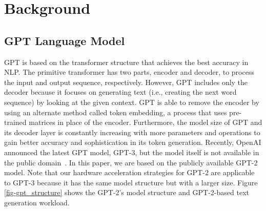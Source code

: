 

\section{Background}
\label{background}

\subsection{GPT Language Model} \label{background_gpt}


GPT is based on the transformer\cite{vaswani2017attention} structure that achieves the best accuracy in NLP. The primitive transformer has two parts, encoder and decoder, to process the input and output sequence, respectively. However, GPT includes only the decoder because it focuses on generating text (i.e., creating the next word sequence) by looking at the given context. GPT is able to remove the encoder by using an alternate method called token embedding, a process that uses pre-trained matrices in place of the encoder. Furthermore, the model size of GPT and its decoder layer is constantly increasing with more parameters and operations to gain better accuracy and sophistication in its token generation. Recently, OpenAI announced the latest GPT model, GPT-3, but the model itself is not available in the public domain~\cite{openaigpt3}. In this paper, we are based on the publicly available GPT-2 model. Note that our hardware acceleration strategies for GPT-2 are applicable to GPT-3 because it has the same model structure but with a larger size.
Figure \ref{fig-gpt_structure} shows the GPT-2's model structure and GPT-2-based text generation workload.


